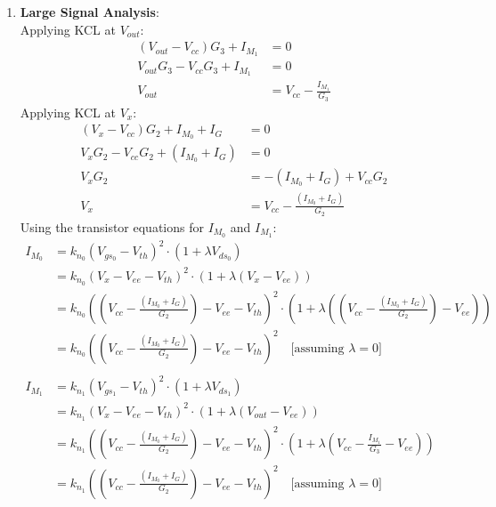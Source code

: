 \begin{enumerate}
  \item \textbf{Large Signal Analysis}:\\
    Applying KCL at $V_{out}$:
    \begin{align*}
      (V_{out} - V_{cc})G_3 + I_{M_1} &= 0 \\
      V_{out}G_3 - V_{cc}G_3 + I_{M_1} &= 0 \\
      V_{out} &= V_{cc} - \frac{I_{M_1}}{G_3} \tag{1}\end{align*}
    Applying KCL at $V_{x}$:
    \begin{align*}
      (V_{x} - V_{cc})G_2 + I_{M_0} + I_{G} &= 0 \\
      V_{x}G_2 - V_{cc}G_2 + (I_{M_0} + I_{G}) &= 0 \\
      V_{x}G_2 &= - (I_{M_0} + I_{G}) + V_{cc}G_2 \\
      V_{x} &= V_{cc} - \frac{(I_{M_0} + I_{G})}{G_2} \tag{2}
    \end{align*}
    Using the transistor equations for $I_{M_0}$ and
    $I_{M_1}$:
    \begin{align*}
      I_{M_0} &= k_{n_0}(V_{gs_0} - V_{th})^2 \cdot (1 + \lambda V_{ds_0}) \\
              &= k_{n_0}(V_{x} - V_{ee} - V_{th})^2 \cdot (1 + \lambda (V_{x} - V_{ee})) \\
              &= k_{n_0}\left(\left(V_{cc} - \frac{(I_{M_0} + I_{G})}{G_2}\right) - V_{ee} - V_{th}\right)^2 \cdot \left(1 + \lambda \left(\left(V_{cc} - \frac{(I_{M_0} + I_{G})}{G_2}\right) - V_{ee}\right)\right) \\
              &= k_{n_0}\left(\left(V_{cc} - \frac{(I_{M_0} + I_{G})}{G_2}\right) - V_{ee} - V_{th}\right)^2 \quad \text{[assuming } \lambda = 0 \text{]} \tag{3} \\ \\
      I_{M_1} &= k_{n_1}(V_{gs_1} - V_{th})^2 \cdot (1 + \lambda V_{ds_1}) \\
              &= k_{n_1}(V_{x} - V_{ee} - V_{th})^2 \cdot (1 + \lambda (V_{out} - V_{ee})) \\
              &= k_{n_1}\left(\left(V_{cc} - \frac{(I_{M_0} + I_{G})}{G_2}\right) - V_{ee} - V_{th}\right)^2 \cdot \left(1 + \lambda \left(V_{cc} - \frac{I_{M_1}}{G_3} - V_{ee}\right)\right) \\
              &= k_{n_1}\left(\left(V_{cc} - \frac{(I_{M_0} + I_{G})}{G_2}\right) - V_{ee} - V_{th}\right)^2 \quad \text{[assuming } \lambda = 0 \text{]} \tag{4} \\

\end{align*}
\end{enumerate}
